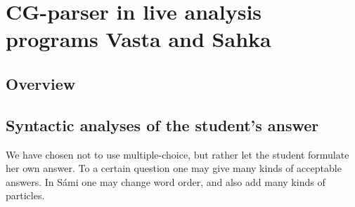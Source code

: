 \documentclass[11pt]{article}
\begin{document}
\section{CG-parser in live analysis programs Vasta and Sahka}\label{vastasahka}




\subsection{Overview}




\subsection{Syntactic analyses of the student's answer} \label{sentencefeedback}
We have chosen not to use multiple-choice, but rather let the student formulate her own answer. To a certain question one may give many kinds of acceptable answers. In Sámi one may change word order, and also add many kinds of particles. 
\end{document}
